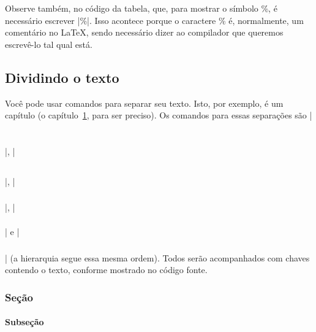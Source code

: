 \documentclass[12pt,oneside,a4paper,english,brazil]{abntex2}
\begin{document}
        Observe também, no código da tabela, que, para mostrar o símbolo \%, é necessário escrever \ltx|\%|. Isso acontece porque o caractere \% é, normalmente, um comentário no \LaTeX, sendo necessário dizer ao compilador que queremos escrevê-lo tal qual está.

\chapter{Dividindo o texto} \label{cap:dividindo_o_texto}

     Você pode usar comandos para separar seu texto. Isto, por exemplo, é um capítulo (o capítulo~\ref{cap:dividindo_o_texto}, para ser preciso). Os comandos para essas separações são \ltx|\part{}|, \ltx|\chapter{}|, \ltx|\section{}|, \ltx|\subsection{}| e \ltx|\subsubsection{}| (a hierarquia segue essa mesma ordem). Todos serão acompanhados com chaves contendo o texto, conforme mostrado no código fonte.
    
     \section{Seção}
        \lipsum[1] %
    
         \subsection{Subseção}
            \lipsum[2] %
        
\end{document}
